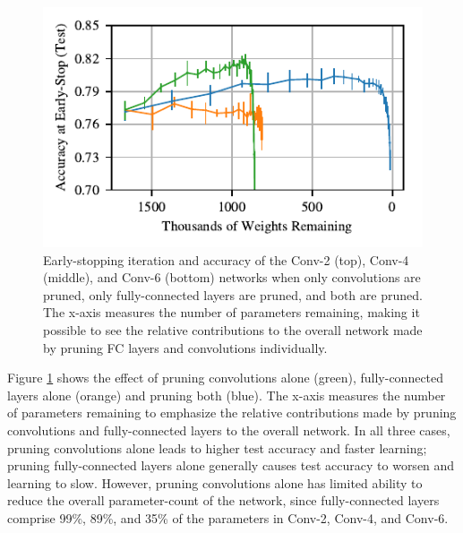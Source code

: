 \begin{figure}
\includegraphics[width=.5\textwidth]{graphs/cifar10/conv/conv_vs_fc3/accuracy}
\vspace{-.5em}
\caption{Early-stopping iteration and accuracy of the Conv-2 (top), Conv-4 (middle), and Conv-6 (bottom) networks when only convolutions are pruned, only
fully-connected layers are pruned, and both are pruned. The x-axis measures the number of parameters remaining, making it possible to see the relative
contributions to the overall network made by pruning FC layers and convolutions individually.}
\label{fig:question-1b}
\end{figure}

Figure \ref{fig:question-1b} shows the effect of pruning convolutions alone (green), fully-connected layers alone (orange) and pruning
both (blue). The x-axis measures the number of parameters remaining to emphasize the relative contributions made by pruning convolutions and fully-connected
layers to the overall network. In all three cases, pruning convolutions alone leads to higher test accuracy and faster learning; pruning fully-connected
layers alone generally causes test accuracy to worsen and learning to slow.
However, pruning convolutions alone has limited ability to reduce the overall parameter-count of the network, since
fully-connected layers comprise 99\%, 89\%, and 35\% of the
parameters in Conv-2, Conv-4, and Conv-6.